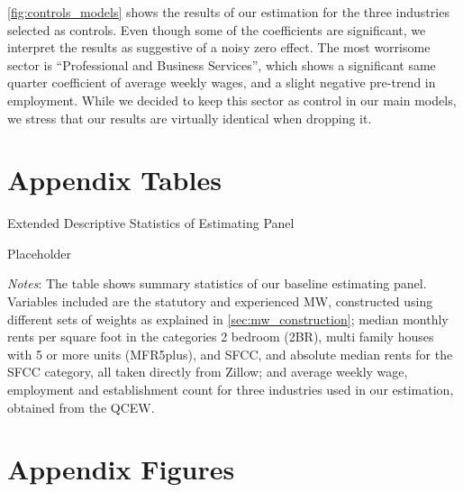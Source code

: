 \autoref{fig:controls_models} shows the results of our estimation for the three industries 
selected as controls. Even though some of the coefficients are significant, we interpret the 
results as suggestive of a noisy zero effect. The most worrisome sector is ``Professional 
and Business Services'', which shows a significant same quarter coefficient of average weekly
wages, and a slight negative pre-trend in employment. While we decided to keep this sector as
control in our main models, we stress that our results are virtually identical when dropping it.

\clearpage
\section{Appendix Tables}

\begin{table}[h!]
	\caption{Extended Descriptive Statistics of Estimating Panel}
	\label{tab:estimating_panel_stats_long}
	\centering
	Placeholder
	\begin{minipage}{0.95\textwidth} \footnotesize
		\vspace{3mm} 
		\textit{Notes}: The table shows summary statistics of our baseline estimating panel.
		Variables included are the statutory and experienced MW, constructed using different
		sets of weights as explained in \autoref{sec:mw_construction}; median monthly rents 
		per square foot in the categories 2 bedroom (2BR), multi family houses with 5 or more 
		units (MFR5plus), and SFCC, and absolute median rents for the SFCC category, all taken
		directly from Zillow; and average weekly wage, employment and establishment count 
		for three industries used in our estimation, obtained from the QCEW.
	\end{minipage}
\end{table}



\clearpage
\section{Appendix Figures}


